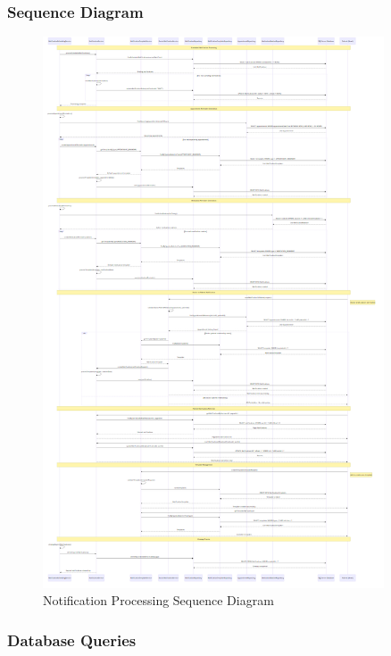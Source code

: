 \documentclass[12pt,a4paper]{article}
\begin{document}
\subsubsection{Sequence Diagram}

\begin{figure}[H]
\centering
\includegraphics[width=0.9\textwidth]{diagrams/notification_sequence.png}
\caption{Notification Processing Sequence Diagram}
\label{fig:notification-sequence}
\end{figure}

\subsubsection{Database Queries}
\end{document}
